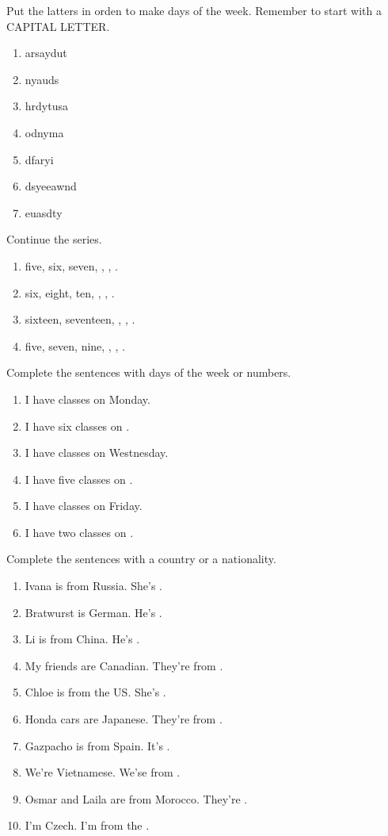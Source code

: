 \problem Put the latters in orden to make days of the week. Remember to start with a CAPITAL LETTER.
\begin{enumerate}
    \item arsaydut \sp {} 
    \item nyauds \sp {}
    \item hrdytusa \sp {}
    \item odnyma \sp {}
    \item dfaryi \sp {}
    \item dsyeeawnd \sp {}
    \item euasdty \sp {}
\end{enumerate}


\problem Continue the series.
\begin{enumerate}
    \item five, six, seven, , , .
    \item six, eight, ten, , , .
    \item sixteen, seventeen, , , .
    \item five, seven, nine, , , .
\end{enumerate}


\problem Complete the sentences with days of the week or numbers.
\begin{enumerate}
    \item I have  classes on Monday.
    \item I have six classes on .
    \item I have  classes on Westnesday.
    \item I have five classes on .
    \item I have  classes on Friday.
    \item I have two classes on .
\end{enumerate}


\problem Complete the sentences with a country or a nationality.
\begin{enumerate}
    \item Ivana is from Russia. She's .
    \item Bratwurst is German. He's .
    \item Li is from China. He's .
    \item My friends are Canadian. They're from .
    \item Chloe is from the US. She's .
    \item Honda cars are Japanese. They're from .
    \item Gazpacho is from Spain. It's .
    \item We're Vietnamese. We'se from .
    \item Osmar and Laila are from Morocco. They're .
    \item I'm Czech. I'm from the . 
\end{enumerate}
